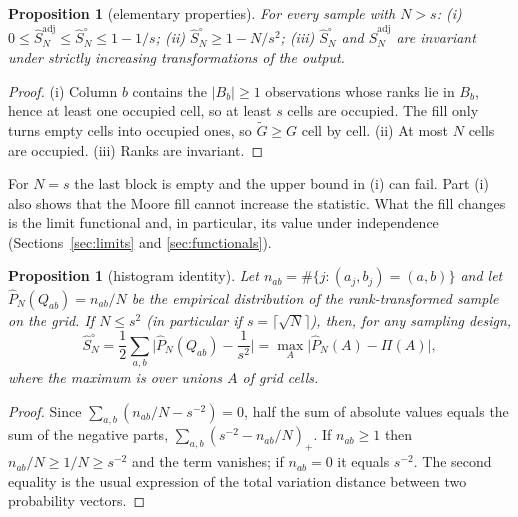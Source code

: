 \documentclass[11pt,a4paper]{article}
\newtheorem{proposition}[theorem]{Proposition}
\theoremstyle{definition}
\theoremstyle{remark}
\newcommand{\Sadj}{\hat S^{\mathrm{adj}}_N}
\newcommand{\Sun}{\hat S^{\circ}_N}
\begin{document}
\begin{proposition}[elementary properties]\label{prop:elementary}
For every sample with $N>s$:
(i) $0\le\Sadj\le\Sun\le 1-1/s$; (ii) $\Sun\ge 1-N/s^2$; (iii) $\Sun$ and $\Sadj$ are invariant under strictly increasing transformations of the output.
\end{proposition}

\begin{proof}
(i) Column $b$ contains the $|B_b|\ge1$ observations whose ranks lie in $B_b$, hence at least one occupied cell, so at least $s$ cells are occupied. The fill only turns empty cells into occupied ones, so $\tilde G\ge G$ cell by cell. (ii) At most $N$ cells are occupied. (iii) Ranks are invariant.
\end{proof}

For $N=s$ the last block is empty and the upper bound in (i) can fail. Part (i) also shows that the Moore fill cannot increase the statistic. What the fill changes is the limit functional and, in particular, its value under independence (Sections~\ref{sec:limits} and \ref{sec:functionals}).

\begin{proposition}[histogram identity]\label{prop:histdelta}
Let $n_{ab}=\#\{j:(a_j,b_j)=(a,b)\}$ and let $\hat P_N(Q_{ab})=n_{ab}/N$ be the empirical distribution of the rank-transformed sample on the grid. If $N\le s^2$ (in particular if $s=\lceil\sqrt N\rceil$), then, for any sampling design,
\begin{equation}\label{eq:histdelta}
\Sun=\frac12\sum_{a,b}\Big|\hat P_N(Q_{ab})-\frac1{s^2}\Big|=\max_{A}\big|\hat P_N(A)-\Pi(A)\big|,
\end{equation}
where the maximum is over unions $A$ of grid cells.
\end{proposition}

\begin{proof}
Since $\sum_{a,b}(n_{ab}/N-s^{-2})=0$, half the sum of absolute values equals the sum of the negative parts, $\sum_{a,b}(s^{-2}-n_{ab}/N)_+$. If $n_{ab}\ge1$ then $n_{ab}/N\ge1/N\ge s^{-2}$ and the term vanishes; if $n_{ab}=0$ it equals $s^{-2}$. The second equality is the usual expression of the total variation distance between two probability vectors.
\end{proof}
\end{document}
